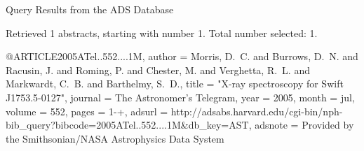 Query Results from the ADS Database


Retrieved 1 abstracts, starting with number 1.  Total number selected: 1.

@ARTICLE{2005ATel..552....1M,
   author = {{Morris}, D.~C. and {Burrows}, D.~N. and {Racusin}, J. and {Roming}, P. and 
	{Chester}, M. and {Verghetta}, R.~L. and {Markwardt}, C.~B. and 
	{Barthelmy}, S.~D.},
    title = "{X-ray spectroscopy for Swift J1753.5-0127}",
  journal = {The Astronomer's Telegram},
     year = 2005,
    month = jul,
   volume = 552,
    pages = {1-+},
   adsurl = {http://adsabs.harvard.edu/cgi-bin/nph-bib_query?bibcode=2005ATel..552....1M&db_key=AST},
  adsnote = {Provided by the Smithsonian/NASA Astrophysics Data System}
}


